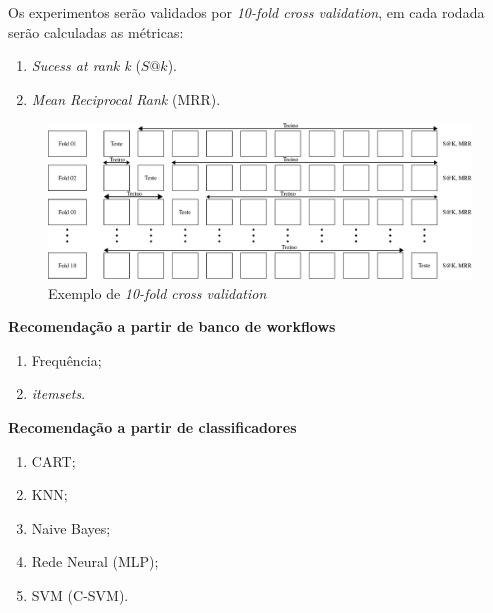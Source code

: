 \begin{frame}
	\begin{block}{}
		Os experimentos serão validados por \emph{10-fold cross validation}, em cada rodada serão calculadas as métricas:
		\begin{enumerate}
			\item \emph{Sucess at rank k} (\(S@k\)).
			\item \emph{Mean Reciprocal Rank} (MRR).		
		\end{enumerate}
		
		\begin{figure}
			\begin{minipage}[b]{0.9\textwidth}
				\includegraphics[width=\textwidth]{./secoes/ConceitosFundamentais/10FOLDCROSS.eps}
				\caption{Exemplo de \emph{10-fold cross validation}}
			\end{minipage}
		\end{figure}
		
	\end{block}
\end{frame}

\begin{frame}
	\begin{block}{}
		\textbf{Recomendação a partir de banco de workflows}
		\begin{enumerate}
			\item Frequência;
			\item \emph{itemsets}.	
		\end{enumerate}
	\end{block}
\end{frame}


\begin{frame}
	\begin{block}{}
		\textbf{Recomendação a partir de classificadores}
		\begin{enumerate}
			\item CART;
			\item KNN;
			\item Naive Bayes;
			\item Rede Neural (MLP);
			\item SVM (C-SVM).		
		\end{enumerate}
	\end{block}
\end{frame}

